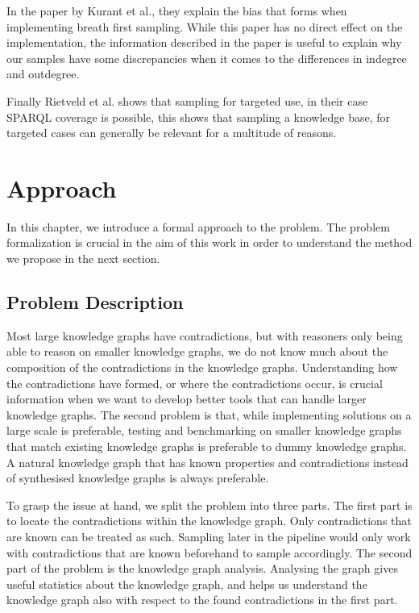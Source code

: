 \documentclass[11pt,letterpaper ,oneside ]{book}
\begin{document}
	In the paper by Kurant et al.\cite{Kurant:2011}, they explain the bias that forms when implementing breath first sampling.
	While this paper has no direct effect on the implementation, the information described in the paper is useful to explain why our samples have some discrepancies when it comes to the differences in indegree and outdegree. 
	
	Finally Rietveld et al.\cite{Rietveld:2014} shows that sampling for targeted use, in their case SPARQL coverage is possible, this shows that sampling a knowledge base, for targeted cases can generally be relevant for a multitude of reasons.
	
	
	\newpage
	\chapter{Approach}\label{ProblemDefintion}
	In this chapter, we introduce a formal approach to the problem. The problem formalization is crucial in the aim of this work in order to understand the method we propose in the next section.
	
	\section{Problem Description}
	Most large knowledge graphs have contradictions, but with reasoners only being able to reason on smaller knowledge graphs, we do not know much about the composition of the contradictions in the knowledge graphs. Understanding how the contradictions have formed, or where the contradictions occur, is crucial information when we want to develop better tools that can handle larger knowledge graphs. The second problem is that, while implementing solutions on a large scale is preferable, testing and benchmarking on smaller knowledge graphs that match existing knowledge graphs is preferable to dummy knowledge graphs. A natural knowledge graph that has known properties and contradictions instead of synthesised knowledge graphs is always preferable. 
	
	To grasp the issue at hand, we split the problem into three parts. The first part is to locate the contradictions within the knowledge graph. Only contradictions that are known can be treated as such. Sampling later in the pipeline would only work with contradictions that are known beforehand to sample accordingly.
	The second part of the problem is the knowledge graph analysis. Analysing the graph gives useful statistics about the knowledge graph, and helps us understand the knowledge graph also with respect to the found contradictions in the first part.
	
\end{document}
